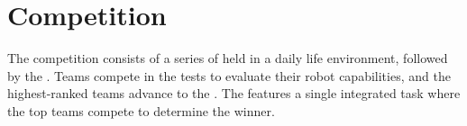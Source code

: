 \section{Competition}
The competition consists of a series of  held in a daily life environment, followed by the \FINAL{}.
Teams compete in the tests to evaluate their robot capabilities, and the highest-ranked teams advance to the \FINAL{}.
The \FINAL{} features a single integrated task where the top teams compete to determine the winner.